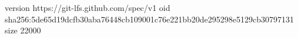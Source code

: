 version https://git-lfs.github.com/spec/v1
oid sha256:5de65d19dcfb30aba76448cb109001c76e221bb20de295298e5129cb30797131
size 22000
